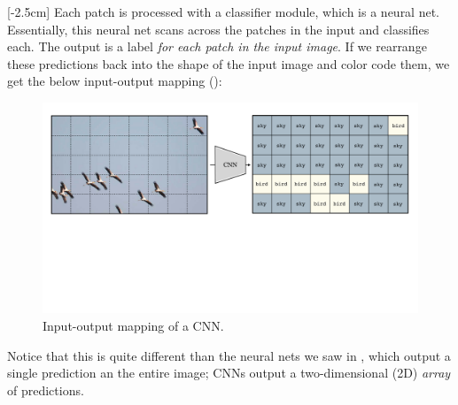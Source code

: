[-2.5cm]
Each patch is processed with a classifier module, which is a neural net. Essentially, this neural net scans across the patches in the input and classifies each. The output is a label \textit{for each patch in the input image}. If we rearrange these predictions back into the shape of the input image and color code them, we get the below input-output mapping (\fig{\ref{fig:convolutional_neural_nets:CNN_example_coarse}}):
\vspace{-0.2cm}
\begin{figure}[h!]
    \centerline{
        \includegraphics[width=0.95\linewidth]{./figures/convolutional_neural_nets/CNN_example_coarse.pdf}}
    \caption{Input-output mapping of a CNN.}
    \label{fig:convolutional_neural_nets:CNN_example_coarse}
\end{figure}

Notice that this is quite different than the neural nets we saw in \chap{\ref{chapter:neural_nets}}, which output a single prediction an the entire image; CNNs output a two-dimensional (2D) \textit{array} of predictions.

